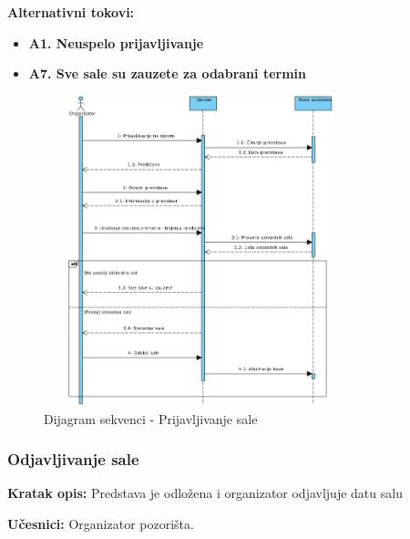 \documentclass[a4paper]{article}
\begin{document}
\noindent\textbf{Alternativni tokovi:} 
\begin{itemize}
 \item \textbf{A1. Neuspelo prijavljivanje} 
  \item \textbf{A7. Sve sale su zauzete za odabrani termin} 
\end{itemize}
\begin{figure}[H]
  \begin{center}
      \includegraphics[width=90mm,height=90mm]{../images/sequence_prijavljivanje_sale.jpg}
  \end{center}
  \caption{Dijagram sekvenci - Prijavljivanje sale}
  \label{sequence_prijavljivanje_sale}
\end{figure}
\subsubsection{Odjavljivanje sale}
\noindent\textbf{Kratak opis:} Predstava je odložena i organizator odjavljuje datu salu

\noindent\textbf{Učesnici:} Organizator pozorišta.
\end{document}
